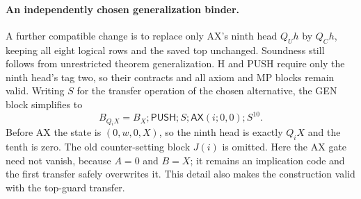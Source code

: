 \paragraph{An independently chosen generalization binder.}
A further compatible change is to replace only AX's ninth head $Q_Uh$ by
$Q_Ch$, keeping all eight logical rows and the saved top unchanged.
Soundness still follows from unrestricted theorem generalization.
H and PUSH require only the ninth head's tag two, so their contracts and
all axiom and MP blocks remain valid.  Writing $S$ for the transfer operation of the chosen alternative,
the GEN block simplifies to
\[
 B_{Q_iX}=B_X;\mathsf{PUSH};S;\mathsf{AX}(i;0,0);S^{10}.
\]
Before AX the state is $(0,w,0,X)$, so the ninth head is exactly $Q_iX$
and the tenth is zero.  The old counter-setting block $J(i)$ is omitted.
Here the AX gate need not vanish, because $A=0$ and $B=X$; it remains an
implication code and the first transfer safely overwrites it.  This detail
also makes the construction valid with the top-guard transfer.
